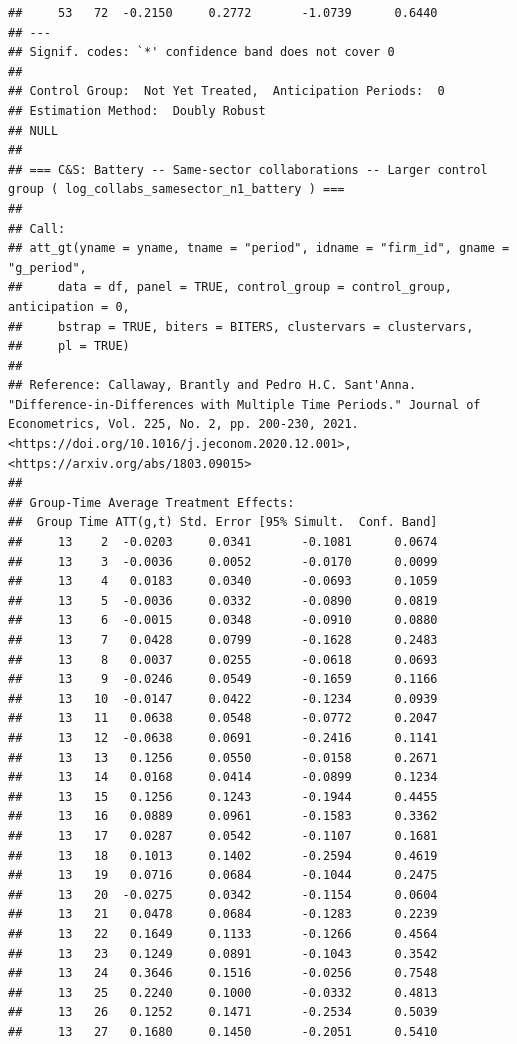 \documentclass[
]{article}
\begin{document}
\begin{verbatim}
##     53   72  -0.2150     0.2772       -1.0739      0.6440  
## ---
## Signif. codes: `*' confidence band does not cover 0
## 
## Control Group:  Not Yet Treated,  Anticipation Periods:  0
## Estimation Method:  Doubly Robust
## NULL
## 
## === C&S: Battery -- Same-sector collaborations -- Larger control group ( log_collabs_samesector_n1_battery ) ===
## 
## Call:
## att_gt(yname = yname, tname = "period", idname = "firm_id", gname = "g_period", 
##     data = df, panel = TRUE, control_group = control_group, anticipation = 0, 
##     bstrap = TRUE, biters = BITERS, clustervars = clustervars, 
##     pl = TRUE)
## 
## Reference: Callaway, Brantly and Pedro H.C. Sant'Anna.  "Difference-in-Differences with Multiple Time Periods." Journal of Econometrics, Vol. 225, No. 2, pp. 200-230, 2021. <https://doi.org/10.1016/j.jeconom.2020.12.001>, <https://arxiv.org/abs/1803.09015> 
## 
## Group-Time Average Treatment Effects:
##  Group Time ATT(g,t) Std. Error [95% Simult.  Conf. Band]  
##     13    2  -0.0203     0.0341       -0.1081      0.0674  
##     13    3  -0.0036     0.0052       -0.0170      0.0099  
##     13    4   0.0183     0.0340       -0.0693      0.1059  
##     13    5  -0.0036     0.0332       -0.0890      0.0819  
##     13    6  -0.0015     0.0348       -0.0910      0.0880  
##     13    7   0.0428     0.0799       -0.1628      0.2483  
##     13    8   0.0037     0.0255       -0.0618      0.0693  
##     13    9  -0.0246     0.0549       -0.1659      0.1166  
##     13   10  -0.0147     0.0422       -0.1234      0.0939  
##     13   11   0.0638     0.0548       -0.0772      0.2047  
##     13   12  -0.0638     0.0691       -0.2416      0.1141  
##     13   13   0.1256     0.0550       -0.0158      0.2671  
##     13   14   0.0168     0.0414       -0.0899      0.1234  
##     13   15   0.1256     0.1243       -0.1944      0.4455  
##     13   16   0.0889     0.0961       -0.1583      0.3362  
##     13   17   0.0287     0.0542       -0.1107      0.1681  
##     13   18   0.1013     0.1402       -0.2594      0.4619  
##     13   19   0.0716     0.0684       -0.1044      0.2475  
##     13   20  -0.0275     0.0342       -0.1154      0.0604  
##     13   21   0.0478     0.0684       -0.1283      0.2239  
##     13   22   0.1649     0.1133       -0.1266      0.4564  
##     13   23   0.1249     0.0891       -0.1043      0.3542  
##     13   24   0.3646     0.1516       -0.0256      0.7548  
##     13   25   0.2240     0.1000       -0.0332      0.4813  
##     13   26   0.1252     0.1471       -0.2534      0.5039  
##     13   27   0.1680     0.1450       -0.2051      0.5410  

\end{verbatim}
\end{document}
